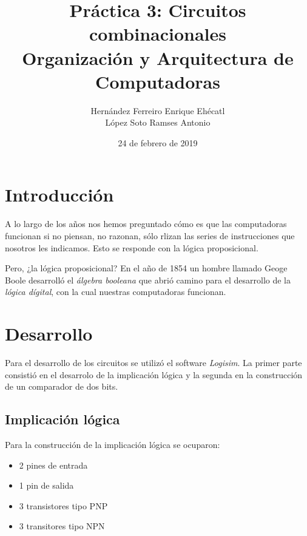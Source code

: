 \documentclass[12pt, letterpaper]{article}
\author{Hernández Ferreiro Enrique Ehécatl \\
          López Soto Ramses Antonio}
\title{Práctica 3: Circuitos combinacionales \\
                {\small Organización y Arquitectura de Computadoras}}
\date{24 de febrero de 2019}
\begin{document}
        \maketitle
        \section{Introducción}

          \hspace{.5cm}
          A lo largo de los años nos hemos preguntado cómo es que las computadoras
          funcionan si no piensan, no razonan, sólo rlizan las series de instrucciones
          que nosotros les indicamos. Esto se responde con la lógica proposicional.\vspace{.3cm}

          Pero, ¿la lógica proposicional? En el año de 1854 un hombre llamado Geoge Boole
          desarrolló el \textit{álgebra booleana} que abrió camino para el desarrollo de la 
          \textit{lógica dígital}, con la cual nuestras computadoras funcionan.

        \section{Desarrollo}

          \hspace{.5cm}
          Para el desarrollo de los circuitos se utilizó el software \textit{Logisim}. La primer
          parte consistió en el desarrolo de la implicación lógica y la segunda en la construcción de un comparador
          de dos bits.

          \subsection{Implicación lógica}

            \hspace{.5cm}
            Para la construcción de la implicación lógica se ocuparon:

            \begin{itemize}
              \item 2 pines de entrada
              \item 1 pin de salida
              \item 3 transistores tipo PNP
              \item 3 transitores tipo NPN
            \end{itemize}
\end{document}

